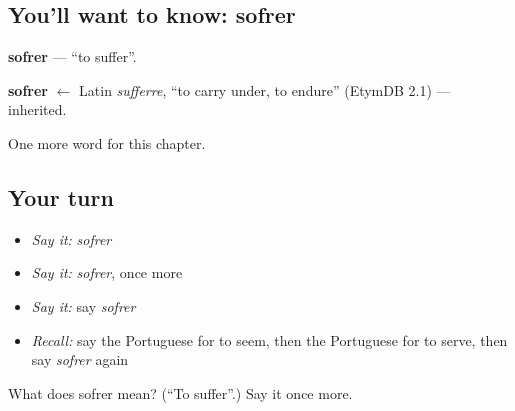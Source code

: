 \subsection*{You'll want to know: sofrer}
\textbf{sofrer} — \textquotedblleft{}to suffer\textquotedblright{}.

\begin{cousinweb}
\textbf{sofrer} $\leftarrow$ Latin \emph{sufferre}, \textquotedblleft{}to carry under, to endure\textquotedblright{} (EtymDB 2.1) — inherited.
\end{cousinweb}

\begin{grammarlens}[title={What you've built}]
One more word for this chapter.
\end{grammarlens}

\subsection*{Your turn}
\begin{itemize}
\raggedright
  \item \emph{Say it:} \emph{sofrer}
  \item \emph{Say it:} \emph{sofrer}, once more
  \item \emph{Say it:} say \emph{sofrer}
  \item \emph{Recall:} say the Portuguese for to seem, then the Portuguese for to serve, then say \emph{sofrer} again
\end{itemize}

\begin{tcolorbox}[breakable,colback=teal!4,colframe=teal!35!black,title={Before you move on}]
What does sofrer mean? (\textquotedblleft{}To suffer\textquotedblright{}.) Say it once more.
\end{tcolorbox}

